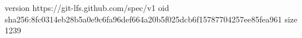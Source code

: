 version https://git-lfs.github.com/spec/v1
oid sha256:8fc0314eb28b5a0e9c6fa96def664a20b5f025dcb6f15787704257ee85fea961
size 1239
